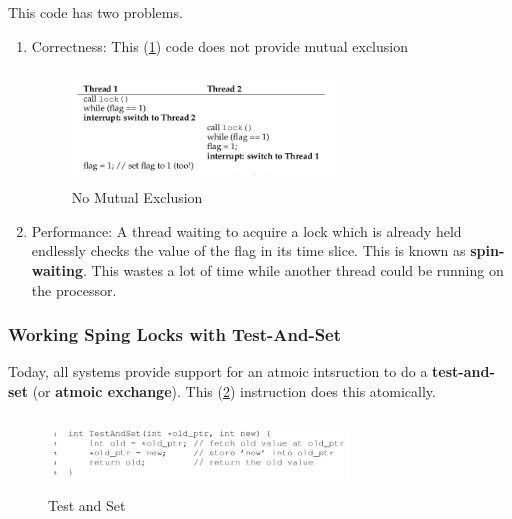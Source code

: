 This code has two problems.\\

\begin{enumerate}
    \item Correctness: This (\ref{282}) code does not provide mutual exclusion
        \begin{figure}[h!]
            \label{282}
            \begin{center}
                \includegraphics[width=7cm, height=3cm]{img/282.png}
                \caption{No Mutual Exclusion}
            \end{center}
        \end{figure}

    \item Performance: A thread waiting to acquire a lock which is already held
        endlessly checks the value of the flag in its time slice. This is known
        as \textbf{spin-waiting}. This wastes a lot of time while another thread
        could be running on the processor.
\end{enumerate}

\subsubsection{Working Sping Locks with Test-And-Set}

Today, all systems provide support for an atmoic intsruction to do a
\textbf{test-and-set} (or \textbf{atmoic exchange}). This (\ref{testandset})
instruction does this atomically.

\begin{figure}[h!]
    \label{testandset}
    \begin{center}
        \includegraphics[width=8cm, height=2cm]{img/testandset.png}
        \caption{Test and Set}
    \end{center}
\end{figure}

